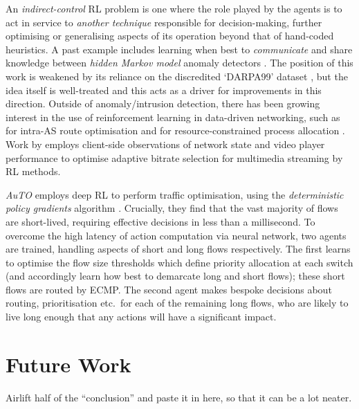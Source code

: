 \documentclass[conference, letterpaper, 10pt, times]{IEEEtran}
\begin{document}
An \emph{indirect-control} RL problem is one where the role played by the agents is to act in service to \emph{another technique} responsible for decision-making, further optimising or generalising aspects of its operation beyond that of hand-coded heuristics.
A past example includes learning when best to \emph{communicate} and share knowledge between \emph{hidden Markov model} anomaly detectors \cite{DBLP:conf/paisi/XuSH07}.
The position of this work is weakened by its reliance on the discredited `DARPA99' dataset \cite{DARPA-IDD, DBLP:conf/cisda/TavallaeeBLG09, DBLP:conf/sp/SommerP10}, but the idea itself is well-treated and this acts as a driver for improvements in this direction.
Outside of anomaly/intrusion detection, there has been growing interest in the use of reinforcement learning in data-driven networking, such as for intra-AS route optimisation \cite{DBLP:conf/hotnets/ValadarskySST17} and for resource-constrained process allocation \cite{DBLP:conf/hotnets/MaoAMK16}.
Work by \textcite{DBLP:conf/sigcomm/MaoNA17} employs client-side observations of network state and video player performance to optimise adaptive bitrate selection for multimedia streaming by RL methods.

\emph{AuTO} \cite{DBLP:conf/sigcomm/ChenL0L18} employs deep RL to perform traffic optimisation, using the \emph{deterministic policy gradients} algorithm \cite{DBLP:conf/icml/SilverLHDWR14}.
Crucially, they find that the vast majority of flows are short-lived, requiring effective decisions in less than a millisecond.
To overcome the high latency of action computation via neural network, two agents are trained, handling aspects of short and long flows respectively.
The first learns to optimise the flow size thresholds which define priority allocation at each switch (and accordingly learn how best to demarcate long and short flows); these short flows are routed by ECMP.
The second agent makes bespoke decisions about routing, prioritisation etc.\ for each of the remaining long flows, who are likely to live long enough that any actions will have a significant impact.


\section{Future Work}

Airlift half of the ``conclusion'' and paste it in here, so that it can be a lot neater.
\end{document}
